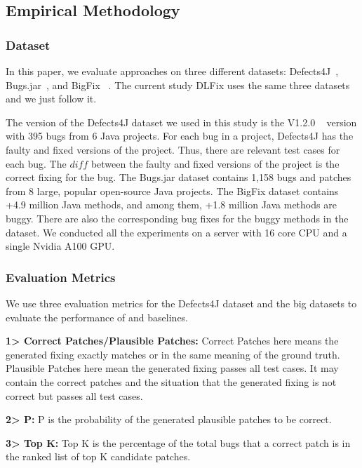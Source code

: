 \subsection{Empirical Methodology}

\subsubsection{Dataset}
\hspace{1cm}
In this paper, we evaluate approaches on three different datasets: Defects4J~\cite{defects4j}, Bugs.jar~\cite{saha2018bugs}, and BigFix ~\cite{yioopsla19}. The current study DLFix \cite{li2020dlfix} uses the same three datasets and we just follow it.

The version of the Defects4J dataset we used in this study is the V1.2.0 ~\cite{defects4j} version with 395 bugs from 6 Java projects. For each bug in a project, Defects4J has the faulty and fixed versions of the project. Thus, there are relevant test cases for each bug. The $diff$ between the faulty and fixed versions of the project is the correct fixing for the bug.
The Bugs.jar dataset contains 1,158 bugs and patches from 8 large, popular open-source Java projects. The BigFix dataset contains +4.9 million Java methods, and among them, +1.8 million Java methods are buggy. There are also the corresponding bug fixes for the buggy methods in the dataset. We conducted all the experiments on a server with 16
core CPU and a single Nvidia A100 GPU.

\subsubsection{Evaluation Metrics}

We use three evaluation metrics for the Defects4J dataset and the big datasets to evaluate the performance of \tool and baselines.

{\bf 1> Correct Patches/Plausible Patches:} Correct Patches here means the generated fixing exactly matches or in the same meaning of the ground truth. Plausible Patches here mean the generated fixing passes all test cases. It may contain the correct patches and the situation that the generated fixing is not correct but passes all test cases.

{\bf 2> P:} P is the probability of the generated plausible patches to be correct.

{\bf 3> Top K:} Top K is the percentage of the total bugs that a correct patch is in the ranked list of top K candidate patches.

